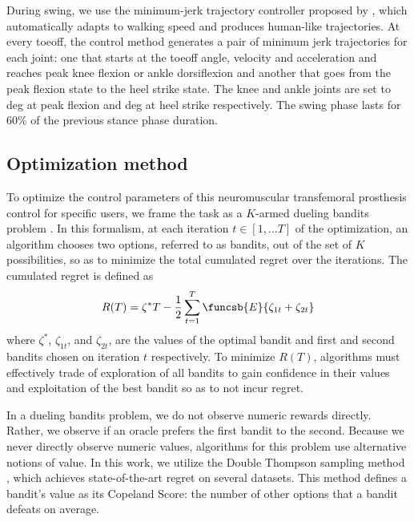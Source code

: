 During swing, we use the minimum-jerk trajectory controller proposed by
\citet{lenzi2014speed}, which automatically adapts to walking speed and produces
human-like trajectories. At every toeoff, the control method generates a pair of
minimum jerk trajectories for each joint: one that starts at the toeoff angle,
velocity and acceleration and reaches peak knee flexion or ankle dorsiflexion
and another that goes from the peak flexion state to the heel strike state. The
knee and ankle joints are set to \unit[65 and 2]{deg} at peak flexion and
\unit[2 and -5]{deg} at heel strike respectively. The swing phase lasts for 60\%
of the previous stance phase duration. 

\subsection{Optimization method}

To optimize the control parameters of this neuromuscular transfemoral prosthesis
control for specific users, we frame the task as a $K$-armed dueling bandits
problem \citep{yue2012k}. In this formalism, at each iteration $t \in [1,\ldots
T]$ of the optimization, an algorithm chooses two options, referred to as
bandits, out of the set of $K$ possibilities, so as to minimize the total
cumulated regret over the iterations. The cumulated regret is defined as
\begin{align}
    R(T) = \zeta^* T - \frac{1}{2} \sum_{t=1}^T \funcsb{E}{\zeta_{1t} + \zeta_{2t}}
\end{align}
where $\zeta^*$, $\zeta_{1t}$, and $\zeta_{2t}$, are the values of the optimal
bandit and first and second bandits chosen on iteration $t$ respectively. To
minimize $R(T)$, algorithms must effectively trade of exploration of all bandits
to gain confidence in their values and exploitation of the best bandit so as to
not incur regret.

In a dueling bandits problem, we do not observe numeric rewards directly.
Rather, we observe if an oracle prefers the first bandit to the second.  Because
we never directly observe numeric values, algorithms for this problem use
alternative notions of value. In this work, we utilize the Double Thompson
sampling method \citep{wu2016double}, which achieves state-of-the-art regret on
several datasets. This method defines a bandit's value as its Copeland Score:
the number of other options that a bandit defeats on average.

